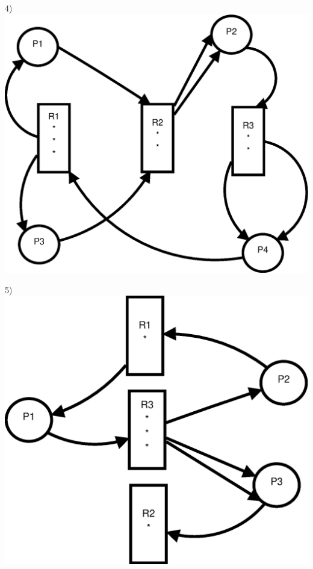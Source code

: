 \documentclass[a4paper, twoside]{article}
\begin{document}
4)\\
\includegraphics*[scale=0.60]{Ejercicio-4.eps}

5)\\
\includegraphics*[scale=0.60]{Ejercicio-5.eps}
\end{document}
